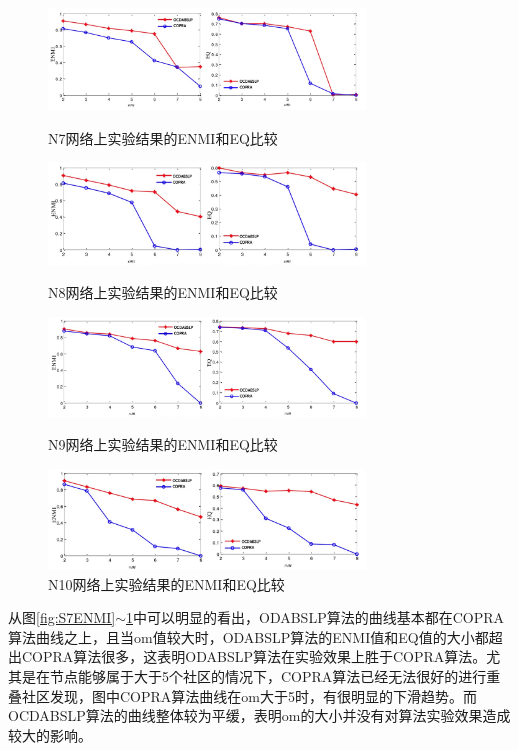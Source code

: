 \begin{figure}
  \centering
  \includegraphics[width=0.75\textwidth]{figures/S7ENMI}
  \caption{N7网络上实验结果的ENMI和EQ比较}\label{fig:S7ENMI}

  \includegraphics[width=0.75\textwidth]{figures/S8ENMI}
  \caption{N8网络上实验结果的ENMI和EQ比较}\label{fig:S8ENMI}

  \includegraphics[width=0.75\textwidth]{figures/S9ENMI}
  \caption{N9网络上实验结果的ENMI和EQ比较}\label{fig:S9ENMI}

  \includegraphics[width=0.75\textwidth]{figures/S10ENMI}
  \caption{N10网络上实验结果的ENMI和EQ比较}\label{fig:S10ENMI}

\end{figure}

从图\ref{fig:S7ENMI}$\sim$\ref{fig:S10ENMI}中可以明显的看出，ODABSLP算法的曲线基本都在COPRA算法曲线之上，且当om值较大时，ODABSLP算法的ENMI值和EQ值的大小都超出COPRA算法很多，这表明ODABSLP算法在实验效果上胜于COPRA算法。尤其是在节点能够属于大于5个社区的情况下，COPRA算法已经无法很好的进行重叠社区发现，图中COPRA算法曲线在om大于5时，有很明显的下滑趋势。而OCDABSLP算法的曲线整体较为平缓，表明om的大小并没有对算法实验效果造成较大的影响。

